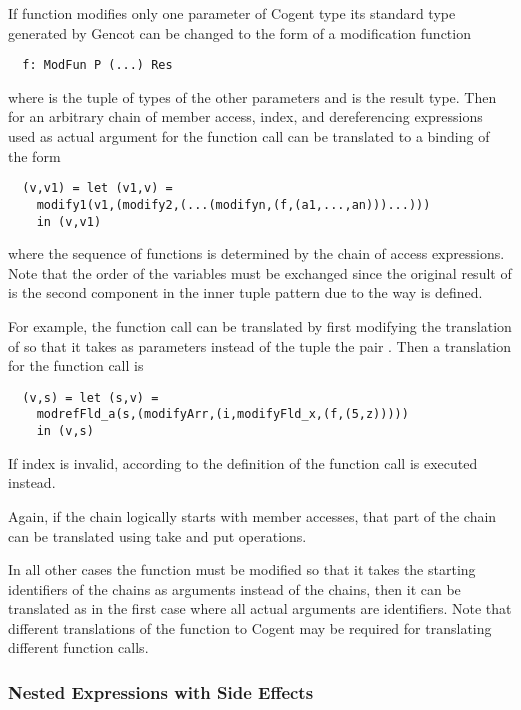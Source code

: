 If function  modifies only one parameter  of Cogent type  its standard type generated by
Gencot can be changed to the form of a modification function
\begin{verbatim}
  f: ModFun P (...) Res
\end{verbatim}
where  is the tuple of types of the other parameters and  is the result type. Then for an arbitrary
chain of member access, index, and dereferencing expressions used as actual argument for  the function call 
can be translated to a binding of the form
\begin{verbatim}
  (v,v1) = let (v1,v) = 
    modify1(v1,(modify2,(...(modifyn,(f,(a1,...,an)))...)))
    in (v,v1)
\end{verbatim}
where the sequence of  functions is determined by the chain of access expressions. Note
that the order of the variables must be exchanged since the original result of  is the second component in 
the inner tuple pattern due to the way  is defined.

For example, the function call  can be translated by first modifying the translation of 
 so that it takes as parameters instead of the tuple  the pair . Then a translation
for the function call is
\begin{verbatim}
  (v,s) = let (s,v) = 
    modrefFld_a(s,(modifyArr,(i,modifyFld_x,(f,(5,z)))))
    in (v,s)
\end{verbatim}
If index  is invalid, according to the definition of  the function call  
is executed instead.

Again, if the chain logically starts with member accesses, that part of the chain can be translated using take and put operations.

In all other cases the function  must be modified so that it takes the starting identifiers of the chains as
arguments instead of the chains, then it can be translated as in the first case where all actual arguments are identifiers.
Note that different translations of the function to Cogent may be required for translating different function calls.

\subsubsection{Nested Expressions with Side Effects}

